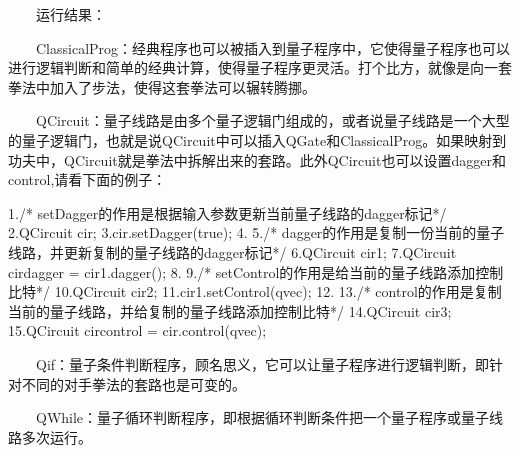 \documentclass[a4paper,11pt,english]{sphinxmanual}
\begin{document}
\sphinxAtStartPar
  运行结果：

\begin{sphinxVerbatim}[commandchars=\\\{\}]
 
 
 
 
 
 
 
 
 
 
 
 
 
 
 
 
\end{sphinxVerbatim}

\sphinxAtStartPar
  ClassicalProg：经典程序也可以被插入到量子程序中，它使得量子程序也可以进行逻辑判断和简单的经典计算，使得量子程序更灵活。打个比方，就像是向一套拳法中加入了步法，使得这套拳法可以辗转腾挪。

\sphinxAtStartPar
  QCircuit：量子线路是由多个量子逻辑门组成的，或者说量子线路是一个大型的量子逻辑门，也就是说QCircuit中可以插入QGate和ClassicalProg。如果映射到功夫中，QCircuit就是拳法中拆解出来的套路。此外QCircuit也可以设置dagger和control,请看下面的例子：

\begin{sphinxVerbatim}[commandchars=\\\{\}]
1./* setDagger的作用是根据输入参数更新当前量子线路的dagger标记*/
2.QCircuit cir;
3.cir.setDagger(true);
4.
5./* dagger的作用是复制一份当前的量子线路，并更新复制的量子线路的dagger标记*/
6.QCircuit cir1;
7.QCircuit cir\PYGZus{}dagger = cir1.dagger();
8.
9./* setControl的作用是给当前的量子线路添加控制比特*/
10.QCircuit cir2;
11.cir1.setControl(qvec);
12.
13./* control的作用是复制当前的量子线路，并给复制的量子线路添加控制比特*/
14.QCircuit cir3;
15.QCircuit cir\PYGZus{}control = cir.control(qvec);
\end{sphinxVerbatim}

\sphinxAtStartPar
  Qif：量子条件判断程序，顾名思义，它可以让量子程序进行逻辑判断，即针对不同的对手拳法的套路也是可变的。

\sphinxAtStartPar
  QWhile：量子循环判断程序，即根据循环判断条件把一个量子程序或量子线路多次运行。
\end{document}
